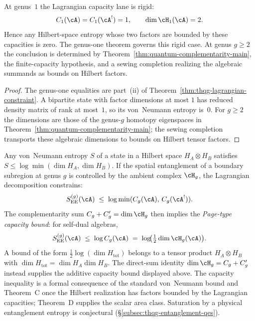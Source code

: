 \begin{proposition}
\label{prop:thqg-genus-one-higher-genus-scope}
At genus~$1$ the Lagrangian capacity lane is rigid:
\[
C_1(\cA)=C_1(\cA^!)=1,\qquad \dim\cH_1(\cA)=2 .
\]
Hence any Hilbert-space entropy whose two factors are bounded by
these capacities is zero.  The genus-one theorem governs this rigid
case.  At genus $g\ge2$ the conclusion
is determined by Theorem~\ref{thm:quantum-complementarity-main}, the
finite-capacity hypothesis, and a sewing completion realizing the
algebraic summands as bounds on Hilbert factors.
\end{proposition}

\begin{proof}
The genus-one equalities are part~\textup{(ii)} of
Theorem~\ref{thm:thqg-lagrangian-constraint}.  A bipartite state with
factor dimensions at most $1$ has reduced density matrix of rank at
most~$1$, so its von~Neumann entropy is~$0$.  For $g\ge2$ the
dimensions are those of the genus-$g$ homotopy eigenspaces in
Theorem~\ref{thm:quantum-complementarity-main}; the sewing completion
transports these algebraic dimensions to bounds on Hilbert tensor
factors.
\end{proof}

\begin{remark}
\label{rem:thqg-capacity-bounds-entanglement}
Any von~Neumann entropy $S$ of a state in a Hilbert space
$H_A \otimes H_B$ satisfies $S \le \log\min(\dim H_A, \dim H_B)$.
If the spatial entanglement of a boundary subregion at genus $g$
is controlled by the ambient complex $\cH_g$, the Lagrangian
decomposition constrains:
\[
S_{\mathrm{EE}}^{(g)}(\cA)
\;\le\;
\log\min(C_g(\cA),\, C_g(\cA^!)).
\]
The complementarity sum $C_g + C_g' = \dim\cH_g$ then implies
the \emph{Page-type capacity bound}: for self-dual algebras,
\[
S_{\mathrm{EE}}^{(g)}(\cA)
\;\le\;
\log C_g(\cA)
\;=\;
\log\!\bigl(\tfrac{1}{2}\dim\cH_g(\cA)\bigr).
\]
A bound of the form $\tfrac12\log(\dim H_{\mathrm{tot}})$ belongs
to a tensor product $H_A\otimes H_B$ with
$\dim H_{\mathrm{tot}}=\dim H_A\dim H_B$.  The direct-sum identity
$\dim\cH_g=C_g+C_g'$ instead supplies the additive capacity bound
displayed above.
The capacity inequality is a formal consequence of the standard
von~Neumann bound and Theorem~C once the Hilbert realization has
factors bounded by the Lagrangian capacities; Theorem~D supplies the
scalar area class.  Saturation by a physical entanglement entropy is
conjectural (\S\ref{subsec:thqg-entanglement-qes}).
\end{remark}

